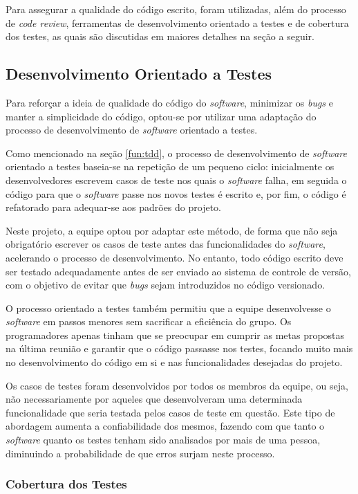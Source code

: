 Para assegurar a qualidade do código escrito, foram utilizadas, além do processo de \emph{code review}, ferramentas de desenvolvimento orientado a testes e de cobertura dos testes, as quais são discutidas em maiores detalhes na seção a seguir.

\subsection{Desenvolvimento Orientado a Testes}

Para reforçar a ideia de qualidade do código do \emph{software}, minimizar os \emph{bugs} e manter a simplicidade do código, optou-se por utilizar uma adaptação do processo de desenvolvimento de \emph{software} orientado a testes.

Como mencionado na seção \ref{fun:tdd}, o processo de desenvolvimento de \emph{software} orientado a testes baseia-se na repetição de um pequeno ciclo: inicialmente os desenvolvedores escrevem casos de teste nos quais o \emph{software} falha, em seguida o código para que o \emph{software} passe nos novos testes é escrito e, por fim, o código é refatorado para adequar-se aos padrões do projeto.

Neste projeto, a equipe optou por adaptar este método, de forma que não seja obrigatório escrever os casos de teste antes das funcionalidades do \emph{software}, acelerando o processo de desenvolvimento.
No entanto, todo código escrito deve ser testado adequadamente antes de ser enviado ao sistema de controle de versão, com o objetivo de evitar que \emph{bugs} sejam introduzidos no código versionado.

O processo orientado a testes também permitiu que a equipe desenvolvesse o \emph{software} em passos menores sem sacrificar a eficiência do grupo.
Os programadores apenas tinham que se preocupar em cumprir as metas propostas na última reunião e garantir que o código passasse nos testes, focando muito mais no desenvolvimento do código em si e nas funcionalidades desejadas do projeto.

Os casos de testes foram desenvolvidos por todos os membros da equipe, ou seja, não necessariamente por aqueles que desenvolveram uma determinada funcionalidade que seria testada pelos casos de teste em questão.
Este tipo de abordagem aumenta a confiabilidade dos mesmos, fazendo com que tanto o \emph{software} quanto os testes tenham sido analisados por mais de uma pessoa, diminuindo a probabilidade de que erros surjam neste processo.


\subsubsection{Cobertura dos Testes}

